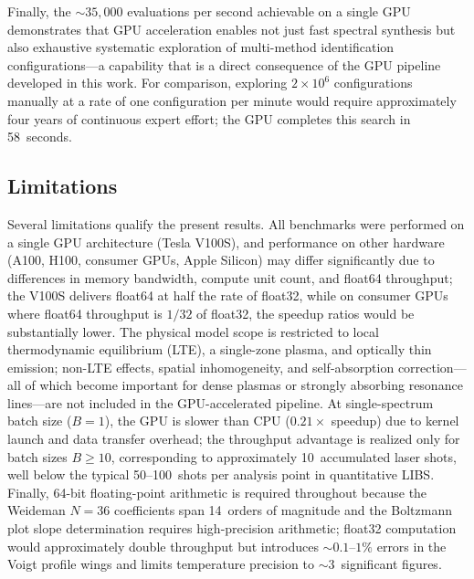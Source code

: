 Finally, the ${\sim}35{,}000$ evaluations per second achievable on a single GPU demonstrates that GPU acceleration enables not just fast spectral synthesis but also exhaustive systematic exploration of multi-method identification configurations---a capability that is a direct consequence of the GPU pipeline developed in this work.
For comparison, exploring $2 \times 10^6$ configurations manually at a rate of one configuration per minute would require approximately four years of continuous expert effort; the GPU completes this search in 58~seconds.

\subsection{Limitations}

Several limitations qualify the present results.
All benchmarks were performed on a single GPU architecture (Tesla V100S), and performance on other hardware (A100, H100, consumer GPUs, Apple Silicon) may differ significantly due to differences in memory bandwidth, compute unit count, and float64 throughput; the V100S delivers float64 at half the rate of float32, while on consumer GPUs where float64 throughput is $1/32$ of float32, the speedup ratios would be substantially lower.
The physical model scope is restricted to local thermodynamic equilibrium (LTE), a single-zone plasma, and optically thin emission; non-LTE effects, spatial inhomogeneity, and self-absorption correction---all of which become important for dense plasmas or strongly absorbing resonance lines---are not included in the GPU-accelerated pipeline.
At single-spectrum batch size ($B = 1$), the GPU is slower than CPU ($0.21\times$ speedup) due to kernel launch and data transfer overhead; the throughput advantage is realized only for batch sizes $B \geq 10$, corresponding to approximately 10~accumulated laser shots, well below the typical 50--100~shots per analysis point in quantitative LIBS.
Finally, 64-bit floating-point arithmetic is required throughout because the Weideman $N = 36$ coefficients span 14~orders of magnitude and the Boltzmann plot slope determination requires high-precision arithmetic; float32 computation would approximately double throughput but introduces $\sim 0.1$--$1\%$ errors in the Voigt profile wings and limits temperature precision to $\sim 3$~significant figures.

